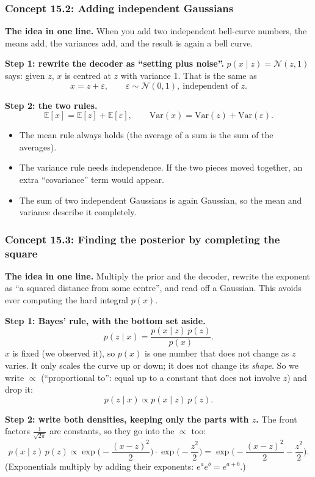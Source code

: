 \documentclass[12pt,a4paper]{article}
\begin{document}
\subsubsection{Concept 15.2: Adding independent Gaussians}\label{c15-2}

\textbf{The idea in one line.} When you add two independent bell-curve numbers, the means add, the variances add, and the result is again a bell curve.

\textbf{Step 1: rewrite the decoder as ``setting plus noise''.} $p(x\mid z)=\mathcal{N}(z,1)$ says: given $z$, $x$ is centred at $z$ with variance 1. That is the same as
\[
x=z+\varepsilon,\qquad\varepsilon\sim\mathcal{N}(0,1),\ \text{independent of }z .
\]

\textbf{Step 2: the two rules.}
\[
\mathbb{E}[x]=\mathbb{E}[z]+\mathbb{E}[\varepsilon],\qquad \mathrm{Var}(x)=\mathrm{Var}(z)+\mathrm{Var}(\varepsilon).
\]
\begin{itemize}[nosep]
  \item The mean rule always holds (the average of a sum is the sum of the averages).
  \item The variance rule needs independence. If the two pieces moved together, an extra ``covariance'' term would appear.
  \item The sum of two independent Gaussians is again Gaussian, so the mean and variance describe it completely.
\end{itemize}

\subsubsection{Concept 15.3: Finding the posterior by completing the square}\label{c15-3}

\textbf{The idea in one line.} Multiply the prior and the decoder, rewrite the exponent as ``a squared distance from some centre'', and read off a Gaussian. This avoids ever computing the hard integral $p(x)$.

\textbf{Step 1: Bayes' rule, with the bottom set aside.}
\[
p(z\mid x)=\frac{p(x\mid z)\,p(z)}{p(x)} .
\]
$x$ is fixed (we observed it), so $p(x)$ is one number that does not change as $z$ varies. It only scales the curve up or down; it does not change its \emph{shape}. So we write $\propto$ (``proportional to'': equal up to a constant that does not involve $z$) and drop it:
\[
p(z\mid x)\propto p(x\mid z)\,p(z).
\]

\textbf{Step 2: write both densities, keeping only the parts with $z$.} The front factors $\frac{1}{\sqrt{2\pi}}$ are constants, so they go into the $\propto$ too:
\[
p(x\mid z)\,p(z)\propto\exp\!\Big(-\frac{(x-z)^2}{2}\Big)\cdot\exp\!\Big(-\frac{z^2}{2}\Big)=\exp\!\Big(-\frac{(x-z)^2}{2}-\frac{z^2}{2}\Big).
\]
(Exponentials multiply by adding their exponents: $e^ae^b=e^{a+b}$.)
\end{document}
